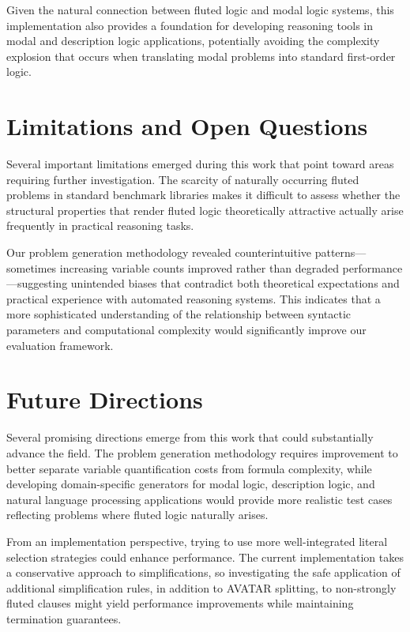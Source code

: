 Given the natural connection between fluted logic and modal logic systems, this implementation also provides a foundation for developing reasoning tools in modal and description logic applications, potentially avoiding the complexity explosion that occurs when translating modal problems into standard first-order logic.

\section*{Limitations and Open Questions}

Several important limitations emerged during this work that point toward areas requiring further investigation. The scarcity of naturally occurring fluted problems in standard benchmark libraries makes it difficult to assess whether the structural properties that render fluted logic theoretically attractive actually arise frequently in practical reasoning tasks.

Our problem generation methodology revealed counterintuitive patterns—sometimes increasing variable counts improved rather than degraded performance—suggesting unintended biases that contradict both theoretical expectations and practical experience with automated reasoning systems. This indicates that a more sophisticated understanding of the relationship between syntactic parameters and computational complexity would significantly improve our evaluation framework.


\section*{Future Directions}

Several promising directions emerge from this work that could substantially advance the field. The problem generation methodology requires improvement to better separate variable quantification costs from formula complexity, while developing domain-specific generators for modal logic, description logic, and natural language processing applications would provide more realistic test cases reflecting problems where fluted logic naturally arises.

From an implementation perspective, trying to use more well-integrated literal selection strategies could enhance performance. The current implementation takes a conservative approach to simplifications, so investigating the safe application of additional simplification rules, in addition to AVATAR splitting, to non-strongly fluted clauses might yield performance improvements while maintaining termination guarantees.


